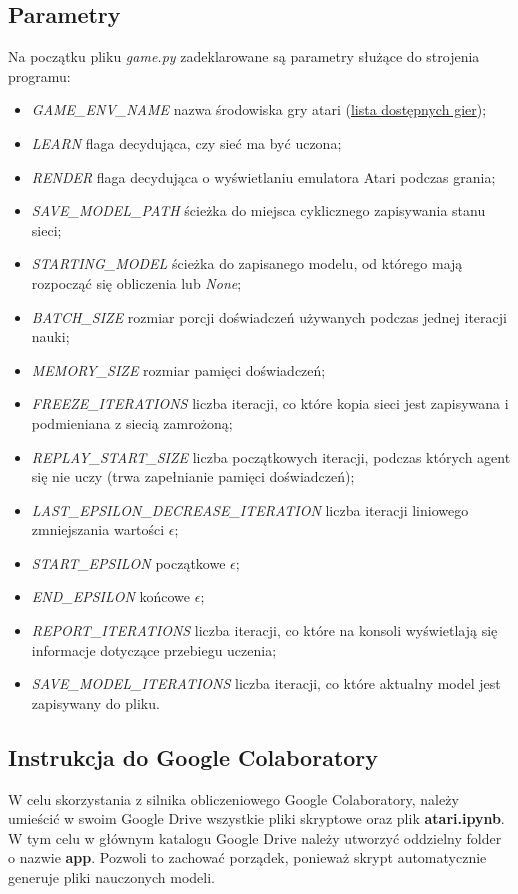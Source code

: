 \documentclass[12pt]{article}
\begin{document}
\subsection{Parametry}
Na początku pliku \textit{game.py} zadeklarowane są parametry służące do strojenia programu:
\begin{itemize}
\item \textit{GAME\_ENV\_NAME} nazwa środowiska gry atari (\href{https://gym.openai.com/envs/#atari}{lista dostępnych gier});
\item \textit{LEARN} flaga decydująca, czy sieć ma być uczona;
\item \textit{RENDER} flaga decydująca o wyświetlaniu emulatora Atari podczas grania;
\item \textit{SAVE\_MODEL\_PATH} ścieżka do miejsca cyklicznego zapisywania stanu sieci;
\item \textit{STARTING\_MODEL} ścieżka do zapisanego modelu, od którego mają rozpocząć się obliczenia lub \textit{None};
\item \textit{BATCH\_SIZE} rozmiar porcji doświadczeń używanych podczas jednej iteracji nauki;
\item \textit{MEMORY\_SIZE} rozmiar pamięci doświadczeń;
\item \textit{FREEZE\_ITERATIONS} liczba iteracji, co które kopia sieci jest zapisywana i podmieniana z siecią zamrożoną;
\item \textit{REPLAY\_START\_SIZE} liczba początkowych iteracji, podczas których agent się nie uczy (trwa zapełnianie pamięci doświadczeń);
\item \textit{LAST\_EPSILON\_DECREASE\_ITERATION} liczba iteracji liniowego zmniejszania wartości $\epsilon$;
\item \textit{START\_EPSILON} początkowe $\epsilon$;
\item \textit{END\_EPSILON} końcowe $\epsilon$;
\item \textit{REPORT\_ITERATIONS} liczba iteracji, co które na konsoli wyświetlają się informacje dotyczące przebiegu uczenia;
\item \textit{SAVE\_MODEL\_ITERATIONS} liczba iteracji, co które aktualny model jest zapisywany do pliku.
\end{itemize}

\subsection{Instrukcja do Google Colaboratory \cite{colab}}

W celu skorzystania z silnika obliczeniowego Google Colaboratory, należy umieścić w swoim Google Drive wszystkie pliki skryptowe oraz plik \textbf{atari.ipynb}. W tym celu w głównym katalogu Google Drive należy utworzyć oddzielny folder o nazwie \textbf{app}. Pozwoli to zachować porządek, ponieważ skrypt automatycznie generuje pliki nauczonych modeli. 
\\
\end{document}
